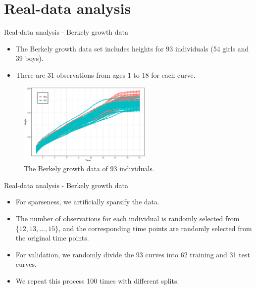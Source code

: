 \documentclass{beamer}
\begin{document}
\section{Real-data analysis}

\begin{frame}{Real-data analysis - Berkely growth data}
	\begin{itemize}
		\item{
			The Berkely growth data set \citep{Tuddenham1954} includes heights for 93 individuals (54 girls and 39 boys).
		}
		\item{
			There are 31 observations from ages 1 to 18 for each curve.
		}
	\end{itemize}
	\begin{figure}[h]
		\centering
		\includegraphics[height=4cm,keepaspectratio=true]{img/growth.eps}
		\caption{The Berkely growth data of 93 individuals.}	\label{fig1}
	\end{figure}
\end{frame}

\begin{frame}{Real-data analysis - Berkely growth data}
	\begin{itemize}
		\item{
			For sparseness, we artificially sparsify the data.
		}
		\item{
			The number of observations for each individual is randomly selected from $\{12,13, \ldots,  15\}$, and the corresponding time points are randomly selected from the original time points. 
		}
		\item{
			For validation, we randomly divide the 93 curves into 62 training and 31 test curves. 
		}
		\item{
			We repeat this process 100 times with different splits.
		}
	\end{itemize}
\end{frame}
\end{document}
